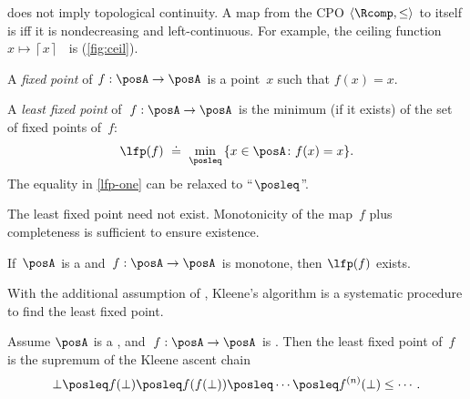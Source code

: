 \begin{remark}
\scottcontinuity does not imply topological continuity. A map from
the CPO $\langle\Rcomp,\leq\rangle$ to itself is \scottcontinuous
iff it is nondecreasing and left-continuous. For example, the ceiling
function $x\mapsto\left\lceil x\right\rceil $~ is \scottcontinuous
(\cref{fig:ceil}).
\end{remark}

\emph{}

A \emph{fixed} \emph{point} of $f:\posA\rightarrow\posA$ is a point~$x$
such that $f(x)=x$.
\begin{definition}
A \emph{least fixed point} of~$f:\posA\rightarrow\posA$ is the minimum
(if it exists) of the set of fixed points of~$f$:
\begin{equation}
\lfp(f)\,\,\doteq\,\,\min_{\posleq}\,\{x\in\posA\colon f(x)=x\}.\label{eq:lfp-one}
\end{equation}
The equality in \eqref{lfp-one} can be relaxed to ``$\posleq$''.
\end{definition}
The least fixed point need not exist. Monotonicity of the map~$f$
plus completeness is sufficient to ensure existence.
\begin{lemma}
\label{lem:CPO-fix-point-2}If~$\posA$ is a \CPO and~$f:\posA\rightarrow\posA$
is monotone, then $\lfp(f)$ exists.
\end{lemma}


With the additional assumption of \scottcontinuity, Kleene's algorithm
is a systematic procedure to find the least fixed point.
\begin{lemma}
\label{lem:kleene-1}Assume $\posA$ is a \CPO, and~$f:\posA\rightarrow\posA$
is \scottcontinuous. Then the least fixed point of~$f$ is the supremum
of the Kleene ascent chain
\[
\bot\posleq f(\bot)\posleq f(f(\bot))\posleq\cdots\posleq f^{(n)}(\bot)\leq\cdots.
\]
\end{lemma}









